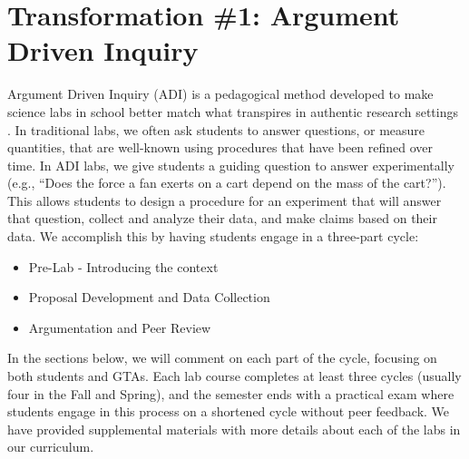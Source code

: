 \documentclass[aip, numerical, preprint]{revtex4-2}
\begin{document}
\section{Transformation \#1: Argument Driven Inquiry}
Argument Driven Inquiry (ADI) is a pedagogical method developed to make science labs
in school better match what transpires in authentic research settings
\citep{Walker2011,Sampson2011,Walker2016}.  In traditional labs, we often ask students to
answer questions, or measure quantities, that are well-known using procedures that have been
refined over time.  In ADI labs, we give students a guiding question to answer experimentally
(e.g., ``Does the force a fan exerts on a cart depend on the mass of the cart?''). This allows
students to design a procedure for an experiment that will answer that question, collect and
analyze their data, and make claims based on their data.  We accomplish this by having students
engage in a three-part cycle:
\begin{itemize}
  \item Pre-Lab - Introducing the context
  \item Proposal Development and Data Collection
  \item Argumentation and Peer Review
\end{itemize}
In the sections below, we will comment on each part of the cycle, focusing on both students and
GTAs. Each lab course completes at least three cycles (usually four in the Fall and Spring),
and the semester ends with a practical exam where students engage in this process on a
shortened cycle without peer feedback.\cite{Wolf2019mask} We have provided supplemental materials
with more details about each of the labs in our curriculum.
\end{document}
